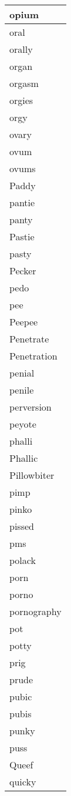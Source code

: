 \begin{longtable}{|l|}
opium \\ \hline 
oral \\ \hline 
orally \\ \hline 
organ \\ \hline 
orgasm \\ \hline 
orgies \\ \hline 
orgy \\ \hline 
ovary \\ \hline 
ovum \\ \hline 
ovums \\ \hline 
Paddy \\ \hline 
pantie \\ \hline 
panty \\ \hline 
Pastie \\ \hline 
pasty \\ \hline 
Pecker \\ \hline 
pedo \\ \hline 
pee \\ \hline 
Peepee \\ \hline 
Penetrate \\ \hline 
Penetration \\ \hline 
penial \\ \hline 
penile \\ \hline 
perversion \\ \hline 
peyote \\ \hline 
phalli \\ \hline 
Phallic \\ \hline 
Pillowbiter \\ \hline 
pimp \\ \hline 
pinko \\ \hline 
pissed \\ \hline 
pms \\ \hline 
polack \\ \hline 
porn \\ \hline 
porno \\ \hline 
pornography \\ \hline 
pot \\ \hline 
potty \\ \hline 
prig \\ \hline 
prude \\ \hline 
pubic \\ \hline 
pubis \\ \hline 
punky \\ \hline 
puss \\ \hline 
Queef \\ \hline 
quicky \\ \hline 

\end{longtable}

